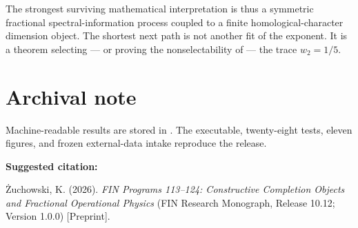 \documentclass[11pt,a4paper,openany]{report}
\begin{document}
The strongest surviving mathematical interpretation is thus a symmetric fractional spectral-information process coupled to a finite homological-character dimension object. The shortest next path is not another fit of the exponent. It is a theorem selecting --- or proving the nonselectability of --- the trace \(w_2=1/5\).


\clearpage
\chapter*{Archival note}
Machine-readable results are stored in
.
The executable, twenty-eight tests, eleven figures, and frozen external-data
intake reproduce the release.

\medskip
\noindent\textbf{Suggested citation:}

\.Zuchowski, K. (2026). \emph{FIN Programs 113--124: Constructive Completion
Objects and Fractional Operational Physics}
(FIN Research Monograph, Release 10.12; Version 1.0.0) [Preprint].
\end{document}
